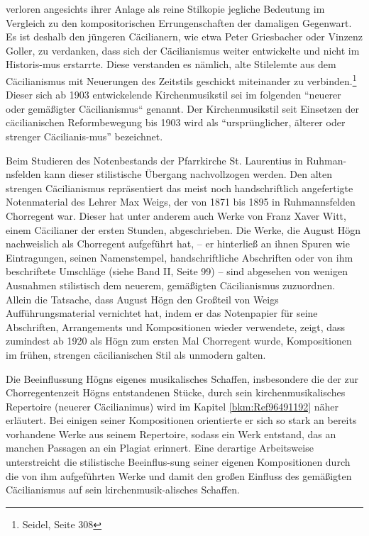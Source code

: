 \documentclass[a4paper]{article}
\begin{document}
verloren angesichts ihrer Anlage als reine Stilkopie jegliche Bedeutung
im Vergleich zu den kompositorischen Errungenschaften der damaligen
Gegenwart. Es ist deshalb den jüngeren Cäcilianern, wie etwa Peter
Griesbacher oder Vinzenz Goller, zu verdanken, dass sich der
Cäcilianismus weiter entwickelte und nicht im Historis-mus erstarrte.
Diese verstanden es nämlich, alte Stilelemte aus dem Cäcilianismus mit
Neuerungen des Zeitstils geschickt miteinander zu verbinden.\footnote{
Seidel, Seite 308} Dieser sich ab 1903 entwickelende Kirchenmusikstil
sei im folgenden “neuerer oder gemäßigter Cäcilianismus“ genannt. Der
Kirchenmusikstil seit Einsetzen der cäcilianischen Reformbewegung bis
1903 wird als “ursprünglicher, älterer oder strenger Cäcilianis-mus”
bezeichnet.

Beim Studieren des Notenbestands der Pfarrkirche St. Laurentius in
Ruhman-nsfelden kann dieser stilistische Übergang nachvollzogen werden.
Den alten strengen Cäcilianismus repräsentiert das meist noch
handschriftlich angefertigte Notenmaterial des Lehrer Max Weigs, der
von 1871 bis 1895 in Ruhmannsfelden Chorregent war. Dieser hat unter
anderem auch Werke von Franz Xaver Witt, einem Cäcilianer der ersten
Stunden, abgeschrieben. Die Werke, die August Högn nachweislich als
Chorregent aufgeführt hat, – er hinterließ an ihnen Spuren wie
Eintragungen, seinen Namenstempel, handschriftliche Abschriften oder
von ihm beschriftete Umschläge (siehe Band II, Seite 99) – sind
abgesehen von wenigen Ausnahmen stilistisch dem neuerem, gemäßigten
Cäcilianismus zuzuordnen. Allein die Tatsache, dass August Högn den
Großteil von Weigs Aufführungsmaterial vernichtet hat, indem er das
Notenpapier für seine Abschriften, Arrangements und Kompositionen
wieder verwendete, zeigt, dass zumindest ab 1920 als Högn zum ersten
Mal Chorregent wurde, Kompositionen im frühen, strengen cäcilianischen
Stil als unmodern galten.

Die Beeinflussung Högns eigenes musikalisches Schaffen, insbesondere die
der zur Chorregentenzeit Högns entstandenen Stücke, durch sein
kirchenmusikalisches Repertoire (neuerer Cäcilianimus) wird im Kapitel
\ref{bkm:Ref96491192} näher erläutert. Bei einigen seiner Kompositionen
orientierte er sich so stark an bereits vorhandene Werke aus seinem
Repertoire, sodass ein Werk entstand, das an manchen Passagen an ein
Plagiat erinnert. Eine derartige Arbeitsweise unterstreicht die
stilistische Beeinflus-sung seiner eigenen Kompositionen durch die von
ihm aufgeführten Werke und damit den großen Einfluss des gemäßigten
Cäcilianismus auf sein kirchenmusik-alisches Schaffen.
\end{document}

